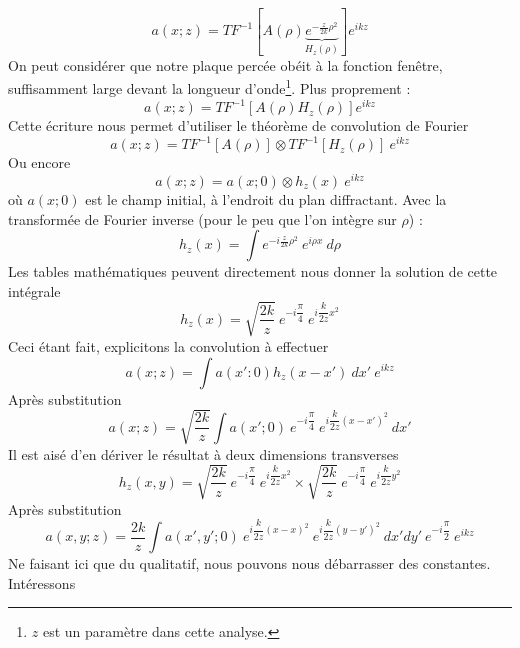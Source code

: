 \begin{equation}
a(x;z) = TF^{-1}\left[A(\rho)\underbrace{e^{-\frac{z}{2k}\rho^2}}_{H_z(\rho)}\right]e^{ikz}
\end{equation}
On peut considérer que notre plaque percée obéit à la fonction fenêtre, suffisamment large devant 
la longueur d'onde\footnote{$z$ est un paramètre dans cette analyse.}. Plus proprement :
\begin{equation}
a(x;z) = TF^{-1}[A(\rho)H_z(\rho)]e^{ikz}
\end{equation}
Cette écriture nous permet d'utiliser le théorème de convolution de Fourier
\begin{equation}
a(x;z) = TF^{-1}[A(\rho)]\otimes TF^{-1}[H_z(\rho)]\ e^{ikz}
\end{equation}
Ou encore
\begin{equation}
a(x;z) = a(x;0)\otimes h_z(x)\ e^{ikz}
\end{equation}
où $a(x;0)$ est le champ initial, à l'endroit du plan diffractant. Avec la transformée de 
Fourier inverse (pour le peu que l'on intègre sur $\rho$) :
\begin{equation}
h_z(x) = \int e^{-i\frac{z}{2k}\rho^2}\ e^{i\rho x}\ d\rho
\end{equation}
Les tables mathématiques peuvent directement nous donner la solution de cette intégrale
\begin{equation}
h_z(x) = \sqrt{\frac{2k}{z}}\ e^{-i\dfrac{\pi}{4}}\ e^{i\dfrac{k}{2z}x^2}
\end{equation}
Ceci étant fait, explicitons la convolution à effectuer
\begin{equation}
a(x;z) = \int a(x':0)h_z(x-x')\ dx'\ e^{ikz}
\end{equation}
Après substitution
\begin{equation}
a(x;z) = \sqrt{\frac{2k}{z}}\int a(x';0) \ e^{-i\dfrac{\pi}{4}}\ e^{i\dfrac{k}{2z}(x-x')^2}\ 
dx'
\end{equation}
Il est aisé d'en dériver le résultat à deux dimensions transverses
\begin{equation}
h_z(x,y) = \sqrt{\frac{2k}{z}}\ e^{-i\dfrac{\pi}{4}}\ e^{i\dfrac{k}{2z}x^2} \times 
\sqrt{\frac{2k}{z}}\ e^{-i\dfrac{\pi}{4}}\ e^{i\dfrac{k}{2z}y^2}
\end{equation}
Après substitution
\begin{equation}
a(x,y;z) = \frac{2k}{z}\int a(x',y';0)\ e^{i\dfrac{k}{2z}(x-x)^2}\
 e^{i\dfrac{k}{2z}(y-y')^2}\ dx'dy'\ e^{-i\dfrac{\pi}{2}}\ e^{ikz}
\end{equation}
Ne faisant ici que du qualitatif, nous pouvons nous débarrasser des constantes. Intéressons
